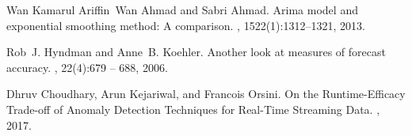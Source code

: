 \begin{thebibliography}{100}
 Wan Kamarul Ariffin~Wan Ahmad and Sabri Ahmad.
\newblock Arima model and exponential smoothing method: {A} comparison.
, 1522(1):1312--1321, 2013.

 Rob~J. Hyndman and Anne~B. Koehler.
\newblock Another look at measures of forecast accuracy.
, 22(4):679 -- 688, 2006.

 Dhruv Choudhary, Arun Kejariwal, and Francois Orsini.
\newblock On the {Runtime}-{Efficacy} {Trade}-off of {Anomaly} {Detection}
  {Techniques} for {Real}-{Time} {Streaming} {Data}.
, 2017.


\end{thebibliography}

\newpage{\pagestyle{empty}\cleardoublepage}